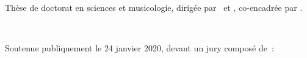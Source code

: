 \begin{titlepage}
	\begin{minipage}[t]{\textwidth}
		\raggedright
		\noindent Thèse de doctorat en sciences et musicologie, dirigée par \thesisFirstSupervisor\ et \thesisSecondSupervisor, co-encadrée par \thesisFirstAdvisor.
	\end{minipage} \\[5mm]

	\begin{minipage}[t]{\textwidth}
		\raggedright
		\noindent  Soutenue publiquement le 24 janvier 2020, devant un jury composé de~:
	\end{minipage} \\[2mm]







\end{titlepage}
